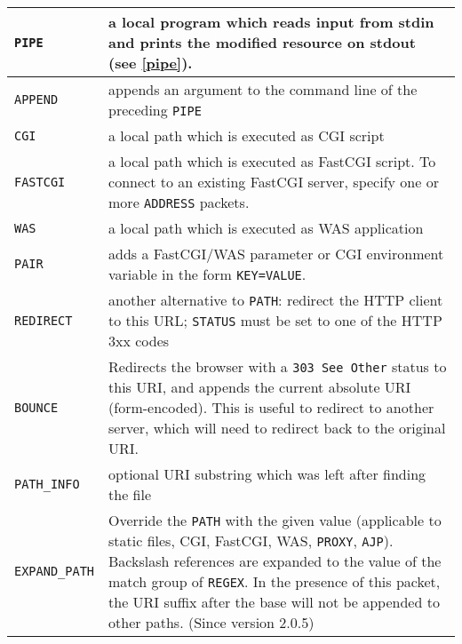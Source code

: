 \documentclass[a4paper,12pt]{article}
\begin{document}
\begin{longtable}{|l|p{8cm}|}
\hline

\verb|PIPE| & a local program which reads input from stdin and
prints the modified resource on stdout (see \ref{pipe}). \\

\hline

\verb|APPEND| & appends an argument to the command line of the
preceding \verb|PIPE| \\

\hline

\verb|CGI| & a local path which is executed as CGI script \\

\hline

\verb|FASTCGI| & a local path which is executed as FastCGI script.
To connect to an existing FastCGI server, specify one or more
\verb|ADDRESS| packets. \\

\hline

\verb|WAS| & a local path which is executed as WAS application \\

\hline

\verb|PAIR| & adds a FastCGI/WAS parameter or CGI environment
variable in the form \texttt{KEY=VALUE}. \\

\hline

\verb|REDIRECT| & another alternative to \verb|PATH|: redirect the
HTTP client to this URL; \verb|STATUS| must be set to one of the
HTTP 3xx codes \\

\hline

\verb|BOUNCE| & Redirects the browser with a \texttt{303 See Other}
status to this URI, and appends the current absolute URI
(form-encoded).  This is useful to redirect to another server, which
will need to redirect back to the original URI. \\

\hline

\verb|PATH_INFO| & optional URI substring which was left after
finding the file \\

\hline

\verb|EXPAND_PATH| & Override the \verb|PATH| with the given value
(applicable to static files, CGI, FastCGI, WAS, \verb|PROXY|,
\verb|AJP|).
Backslash references are expanded to the value of the match group of
\verb|REGEX|. In the presence of this packet, the URI suffix after the
base will not be appended to other paths.  \scriptsize{(Since version
  2.0.5)} \\


\end{longtable}
\end{document}
